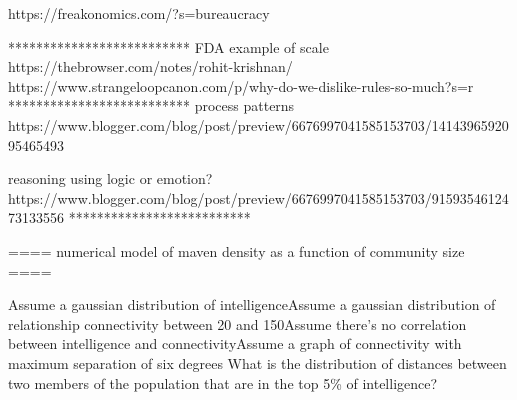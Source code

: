 https://freakonomics.com/?s=bureaucracy

**************************
FDA example of scale
https://thebrowser.com/notes/rohit-krishnan/
https://www.strangeloopcanon.com/p/why-do-we-dislike-rules-so-much?s=r
**************************
process patterns
https://www.blogger.com/blog/post/preview/6676997041585153703/1414396592095465493

reasoning using logic or emotion?
https://www.blogger.com/blog/post/preview/6676997041585153703/9159354612473133556
**************************

==== numerical model of maven density as a function of community size ====

Assume a gaussian distribution of intelligenceAssume a gaussian distribution of relationship connectivity between 20 and 150Assume there's no correlation between intelligence and connectivityAssume a graph of connectivity with maximum separation of six degrees
What is the distribution of distances between two members of the population that are in the top 5\% of intelligence?
